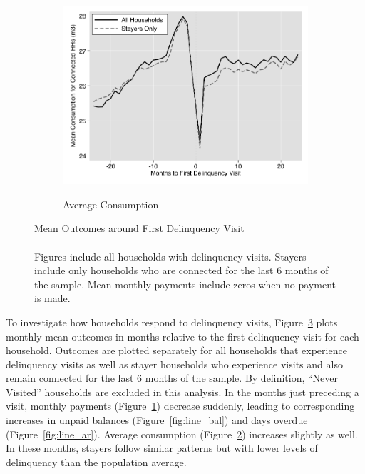 \documentclass[12pt]{article}
\begin{document}
\begin{figure}[hbtp]
\begin{subfigure}[b]{0.49\textwidth}
        \label{fig:line_pay}
    \end{subfigure}
    \vskip 1mm \vskip 0pt
    \begin{subfigure}[b]{.49\textwidth}  
        \centering
        \caption[]{\small Average Consumption} 
        \vspace{-1mm}
        \includegraphics[width=\textwidth,trim={.2cm .2cm .2cm 0cm}, clip=true]{tables/line_c}  
        \label{fig:line_c}
    \end{subfigure}
    \hfill \hspace{.02\textwidth}
    \begin{minipage}{0.47\textwidth}   
    \vspace{-6cm}
    \caption[]
    {\small Mean Outcomes around First Delinquency Visit  \\  \\  Figures include all households with delinquency visits.  Stayers include only households who are connected for the last 6 months of the sample.  Mean monthly payments include zeros when no payment is made. } \label{fig:line_graphs}
    \end{minipage}
\end{figure} 


To investigate how households respond to delinquency visits, Figure~\ref{fig:line_graphs} plots monthly mean outcomes in months relative to the first delinquency visit for each household.  Outcomes are plotted separately for all households that experience delinquency visits as well as stayer households who experience visits and also remain connected for the last 6 months of the sample.  By definition, ``Never Visited'' households are excluded in this analysis.  In the months just preceding a visit, monthly payments (Figure~\ref{fig:line_pay}) decrease suddenly, leading to corresponding increases in unpaid balances (Figure~\ref{fig:line_bal}) and days overdue (Figure~\ref{fig:line_ar}).  Average consumption (Figure~\ref{fig:line_c}) increases slightly as well.  In these months, stayers follow similar patterns but with lower levels of delinquency than the population average.
\end{document}
